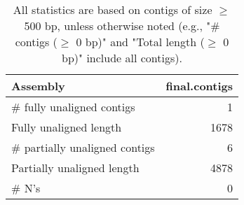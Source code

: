 \documentclass[12pt,a4paper]{article}
\begin{document}
\begin{table}[ht]
\begin{center}
\caption{All statistics are based on contigs of size $\geq$ 500 bp, unless otherwise noted (e.g., "\# contigs ($\geq$ 0 bp)" and "Total length ($\geq$ 0 bp)" include all contigs).}
\begin{tabular}{|l*{1}{|r}|}
\hline
Assembly & final.contigs \\ \hline
\# fully unaligned contigs & 1 \\ \hline
Fully unaligned length & 1678 \\ \hline
\# partially unaligned contigs & 6 \\ \hline
Partially unaligned length & 4878 \\ \hline
\# N's & 0 \\ \hline
\end{tabular}
\end{center}
\end{table}
\end{document}
